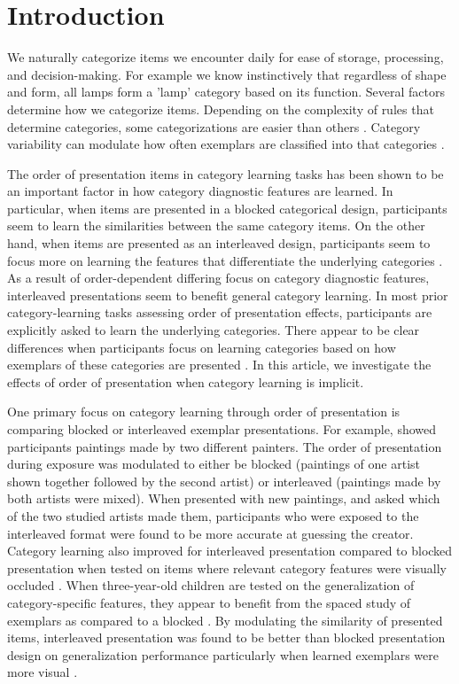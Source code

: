 \section{Introduction}

We naturally categorize items we encounter daily for ease of storage, processing, and decision-making. For example we know instinctively that regardless of shape and form, all lamps form a 'lamp' category based on its function. Several factors determine how we categorize items. Depending on the complexity of rules that determine categories, some categorizations are easier than others \cite{shepard1961learning, nosofsky1994comparing}. Category variability can modulate how often exemplars are classified into that categories \cite{cohen2001category}.

The order of presentation items in category learning tasks has been shown to be an important factor in how category diagnostic features are learned. In particular, when items are presented in a blocked categorical design, participants seem to learn the similarities between the same category items. On the other hand, when items are presented as an interleaved design, participants seem to focus more on learning the features that differentiate the underlying categories \cite{carvalho2017sequence}. As a result of order-dependent differing focus on category diagnostic features, interleaved presentations seem to benefit general category learning. In most prior category-learning tasks assessing order of presentation effects, participants are explicitly asked to learn the underlying categories. There appear to be clear differences when participants focus on learning categories based on how exemplars of these categories are presented \cite{kornell2008learning, kornell2010spacing, whitehead2021transfer, vlach2008spacing, carvalho2014putting, carvalho2017sequence}. In this article, we investigate the effects of order of presentation when category learning is implicit. 

One primary focus on category learning through order of presentation is comparing blocked or interleaved exemplar presentations. For example, \cite{kornell2008learning} showed participants paintings made by two different painters. The order of presentation during exposure was modulated to either be blocked (paintings of one artist shown together followed by the second artist) or interleaved (paintings made by both artists were mixed). When presented with new paintings, and asked which of the two studied artists made them, participants who were exposed to the interleaved format were found to be more accurate at guessing the creator. Category learning also improved for interleaved presentation compared to blocked presentation when tested on items where relevant category features were visually occluded \cite{whitehead2021transfer}. When three-year-old children are tested on the generalization of category-specific features, they appear to benefit from the spaced study of exemplars as compared to a blocked \cite{vlach2008spacing}. By modulating the similarity of presented items, interleaved presentation was found to be better than blocked presentation design on generalization performance particularly when learned exemplars were more visual \cite{kornell2008learning, carvalho2014putting}. 

